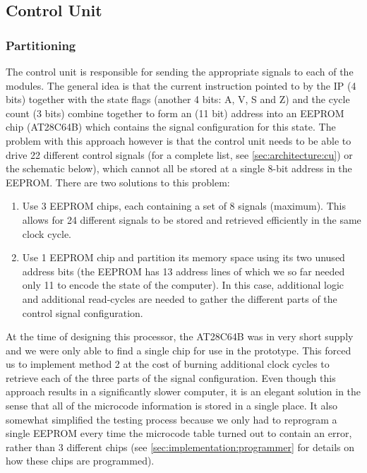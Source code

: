 
\subsection{Control Unit}
\subsubsection{Partitioning}
The control unit is responsible for sending the appropriate signals to each of the modules. The general idea is that the current instruction pointed to by the IP (4 bits) together with the state flags (another 4 bits: A, V, S and Z) and the cycle count (3 bits) combine together to form an (11 bit) address into an EEPROM chip (AT28C64B) which contains the signal configuration for this state. The problem with this approach however is that the control unit needs to be able to drive 22 different control signals (for a complete list, see \ref{sec:architecture:cu}) or the schematic below), which cannot all be stored at a single 8-bit address in the EEPROM. There are two solutions to this problem:
\begin{enumerate}
\item Use 3 EEPROM chips, each containing a set of 8 signals (maximum). This allows for 24 different signals to be stored and retrieved efficiently in the same clock cycle.
\item Use 1 EEPROM chip and partition its memory space using its two unused address bits (the EEPROM has 13 address lines of which we so far needed only 11 to encode the state of the computer). In this case, additional logic and additional read-cycles are needed to gather the different parts of the control signal configuration.
\end{enumerate}

At the time of designing this processor, the AT28C64B was in very short supply and we were only able to find a single chip for use in the prototype. This forced us to implement method 2 at the cost of burning additional clock cycles to retrieve each of the three parts of the signal configuration. Even though this approach results in a significantly slower computer, it is an elegant solution in the sense that all of the microcode information is stored in a single place. It also somewhat simplified the testing process because we only had to reprogram a single EEPROM every time the microcode table turned out to contain an error, rather than 3 different chips (see \ref{sec:implementation:programmer} for details on how these chips are programmed).

